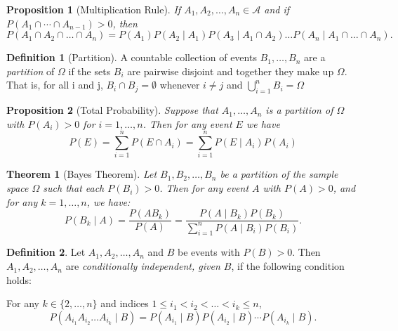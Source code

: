 \documentclass{article}
\newtheorem{theorem}{Theorem}[section]
\newtheorem{proposition}{Proposition}[section]
\theoremstyle{definition}
\newtheorem{definition}{Definition}[section]
\theoremstyle{remark}
\begin{document}
\vspace{.5cm}

\begin{proposition}[Multiplication Rule]\label{prop:partition equation}
If \(A_1, A_2, \dots, A_n \in \mathcal{A}\) and if $ P(A_1 \cap \cdots \cap A_{n-1}) > 0$, then  
\[
P(A_1 \cap A_2 \cap \dots \cap A_n) = P(A_1)P(A_2 \mid A_1)P(A_3 \mid A_1 \cap A_2) \dots P(A_n \mid A_1 \cap \dots \cap A_n).
\]
\end{proposition}



\vspace{.5cm}


\begin{definition}[Partition]\label{def:partition}
A countable collection of events \(B_1, \dots, B_n\) are a \textit{partition} of \(\Omega\) 
if the sets \(B_i\) are pairwise disjoint and together they make up \(\Omega\). 
That is, for all i and j, \( B_i \cap B_j = \emptyset \) whenever \(i \neq j\) 
and \( \bigcup_{i=1}^n B_i = \Omega\)
\end{definition}



\vspace{.5cm}




\begin{proposition}[Total Probability]
Suppose that $A_1, \dots, A_n$ is a partition of $\Omega$ with 
$P(A_i) > 0$ for $i = 1,\dots , n$. Then for any event $E$ we have
\[
P(E) = \sum^n_{i=1} P(E \cap A_i) = \sum_{i=1}^{n} P(E \mid A_i) P(A_i)
\]
\end{proposition}


\vspace{.5cm}



\begin{theorem}[Bayes Theorem]\label{thm:bayes_formula}
Let \( B_1, B_2, \dots, B_n \) be a partition of the sample space \( \Omega \) such that each \( P(B_i) > 0 \). Then for any event \( A \) with \( P(A) > 0 \), and for any \( k = 1, \dots, n \), we have:
\[
P(B_k \mid A) = \frac{P(A B_k)}{P(A)} = \frac{P(A \mid B_k) P(B_k)}{\sum_{i=1}^{n} P(A \mid B_i) P(B_i)}.
\]
\end{theorem}




\vspace{.5cm}




\begin{definition}\label{def:conditional_independence}
Let \( A_1, A_2, \dots, A_n \) and \( B \) be events with \( P(B) > 0 \). Then \( A_1, A_2, \dots, A_n \) are \textit{conditionally independent, given \( B \)}, if the following condition holds:

For any \( k \in \{2, \dots, n\} \) and indices \( 1 \leq i_1 < i_2 < \dots < i_k \leq n \),
\[
P(A_{i_1} A_{i_2} \dots A_{i_k} \mid B) = P(A_{i_1} \mid B) P(A_{i_2} \mid B) \cdots P(A_{i_k} \mid B).
\]
\end{definition}
\end{document}
